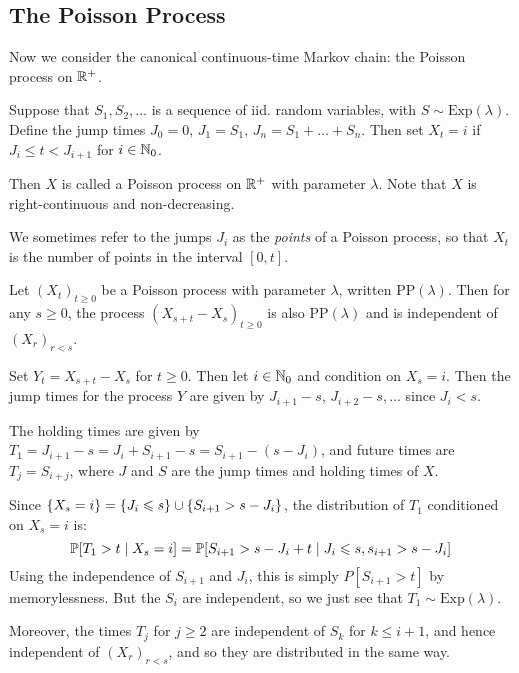 \documentclass{article}
\begin{document}

\subsection{The Poisson Process}

Now we consider the canonical continuous-time Markov chain: the Poisson process on $\R^+$.

\begin{definition}
    Suppose that $S_1, S_2, \dots$ is a sequence of iid. random variables, with $S \sim \mathrm{Exp}(\lambda)$. Define the jump times $J_0 = 0, \, J_1 = S_1, \, J_n = S_1 + \dots + S_n$. Then set $X_t = i$ if $J_i \leq t < J_{i+1}$ for $i \in \N_0$.
    
    Then $X$ is called a Poisson process on $\R^+$ with parameter $\lambda$. Note that $X$ is right-continuous and non-decreasing.
\end{definition}
\begin{note}
	We sometimes refer to the jumps $J_i$ as the \textit{points} of a Poisson process, so that $X_t$ is the number of points in the interval $[0, t]$.
\end{note}

\begin{theorem}
    Let $(X_t)_{t \geq 0}$ be a Poisson process with parameter $\lambda$, written $\mathrm{PP}(\lambda)$. Then for any $s \geq 0$, the process $(X_{s+t} - X_{s})_{t\geq 0}$ is also $\mathrm{PP}(\lambda)$ and is independent of $(X_r)_{r < s}$.
\end{theorem}
\begin{prf}
    Set $Y_t = X_{s+t} - X_s$ for $t \geq 0$. Then let $i \in \N_0$ and condition on $X_s = i$. Then the jump times for the process $Y$ are given by $J_{i+1} - s, \, J_{i+2}-s, \dots$ since $J_i < s$.
    
    The holding times are given by $T_1 = J_{i+1} - s = J_{i} + S_{i+1} - s = S_{i+1} - (s-J_i)$, and future times are $T_j = S_{i+j}$, where $J$ and $S$ are the jump times and holding times of $X$.
    
    Since $\set{X_s = i} = \set{J_i \leq s} \cup \set{S_{i+1} > s - J_i}$, the distribution of $T_1$ conditioned on $X_s = i$ is:
    \[
	\P[T_1 > t \mid X_s = i] = \P[S_{i+1} > s - J_i + t \mid J_i \leq s, s_{i+1} > s - J_i]
	\]
	Using the independence of $S_{i+1}$ and $J_i$, this is simply $P[S_{i+1} > t]$ by memorylessness. But the $S_{i}$ are independent, so we just see that $T_1 \sim \mathrm{Exp}(\lambda)$.
	
	Moreover, the times $T_j$ for $j \geq 2$ are independent of $S_k$ for $k \leq i + 1$, and hence independent of $(X_r)_{r < s}$, and so they are distributed in the same way.
\end{prf}
\end{document}
